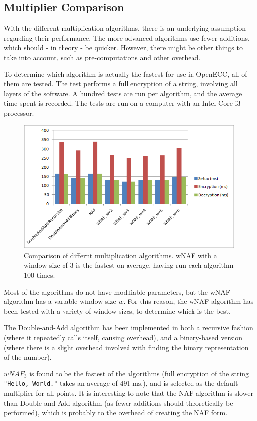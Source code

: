 \subsection{Multiplier Comparison}
\label{sec:performance_multipliers}

With the different multiplication algorithms, there is an underlying assumption regarding their performance. The more
advanced algorithms use fewer additions, which should - in theory - be quicker. However, there might be other things
to take into account, such as pre-computations and other overhead.

To determine which algorithm is actually the fastest for use in OpenECC, all of them are tested. The test performs a
full  encryption of a string, involving all layers of the software. A hundred tests are run
per algorithm, and the average time spent is recorded. The tests are run on a computer with an Intel Core i3 processor.

\begin{figure}[htb!]
	\centering
	\includegraphics[width=\textwidth]{performance/multipliers-comparison}
	\caption{Comparison of differnt multiplication algorithms. wNAF with a window size of 3 is the fastest on average,
		having run each algorithm 100 times.}
	\label{fig:multipliers-comparison}
\end{figure}

Most of the algorithms do not have modifiable parameters, but the wNAF algorithm has a variable window size \(w\). For
this reason, the wNAF algorithm has been tested with a variety of window sizes, to determine which is the best.

The Double-and-Add algorithm has been implemented in both a recursive fashion (where it repeatedly calls itself, causing
overhead), and a binary-based version (where there is a slight overhead involved with finding the binary representation
of the number).

\(wNAF_3\) is found to be the fastest of the algorithms (full encryption of the string \texttt{"Hello, World."} takes an
average of \(491 \text{ ms}\).), and is selected as the default multiplier for all points. It is
interesting to note that the NAF algorithm is slower than Double-and-Add algorithm (as fewer additions should theoretically
be performed), which is probably to the overhead of creating the NAF form.